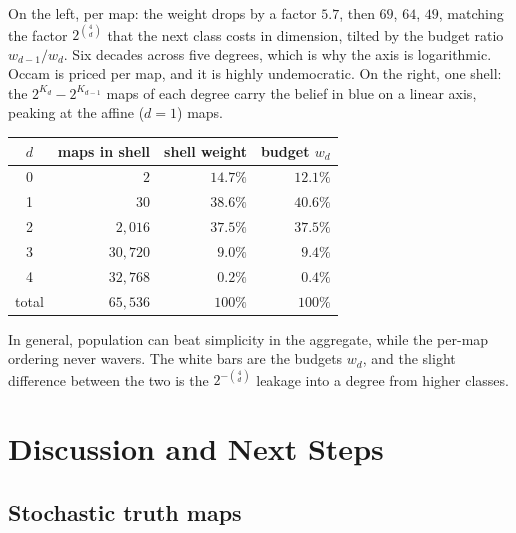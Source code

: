\documentclass[11pt]{article}
\let\stdsection\section
\renewcommand{\section}{\clearpage\stdsection}
\begin{document}
\begin{example}[label=ex:shellsplit]
On the left, per map: the weight drops by a factor $5.7$, then $69$, $64$, $49$,
matching the factor $2^{\binom 4d}$ that the next class costs in dimension,
tilted by the budget ratio $w_{d-1}/w_d$. Six decades across five
degrees, which is why the axis is logarithmic. Occam is priced per
map, and it is highly undemocratic. On the right, one shell: the
$2^{K_d} - 2^{K_{d-1}}$ maps of each degree carry the belief in blue on
a linear axis, peaking at the affine ($d = 1$) maps.

\begin{center}
\begin{tabular}{crrr}
\toprule
$d$ & maps in shell & shell weight & budget $w_d$ \\
\midrule
0 & $2$        & $14.7\%$ & $12.1\%$ \\
1 & $30$       & $38.6\%$ & $40.6\%$ \\
2 & $2{,}016$  & $37.5\%$ & $37.5\%$ \\
3 & $30{,}720$ & $9.0\%$  & $9.4\%$ \\
4 & $32{,}768$ & $0.2\%$  & $0.4\%$ \\
\midrule
total & $65{,}536$ & $100\%$ & $100\%$ \\
\bottomrule
\end{tabular}
\end{center}

In general, population can beat simplicity in the aggregate,
while the per-map ordering never wavers. The white bars are the
budgets $w_d$, and the slight difference between the two is the
$2^{-\binom 4d}$ leakage into a degree from higher classes.
\end{example}

\section{Discussion and Next Steps}\label{sec:next}

\subsection{Stochastic truth maps}
\end{document}
